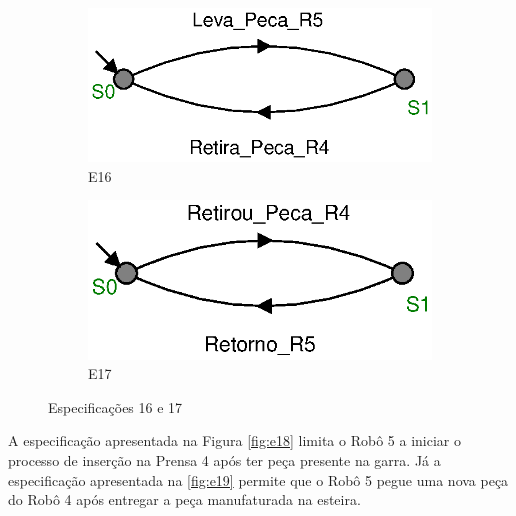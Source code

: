 \begin{figure}[H]%
  \centering
  \begin{subfigure}{0.45\textwidth}
      \centering
      \includegraphics[width=\textwidth]{imagens/E16.eps}
      \caption{E16}
      \label{fig:e16}
  \end{subfigure}
  \hfill
  \begin{subfigure}{0.45\textwidth}
      \centering
      \includegraphics[width=\textwidth]{imagens/E17.eps}
      \caption{E17}
      \label{fig:e17}
  \end{subfigure}
  \caption{Especificações 16 e 17}
  \label{fig:e1617}
\end{figure}

A especificação apresentada na Figura \ref{fig:e18} limita o Robô 5 a iniciar o processo de inserção na Prensa 4 após ter peça presente na garra.
Já a especificação apresentada na \ref{fig:e19} permite que o Robô 5 pegue uma nova peça do Robô 4 após entregar a peça manufaturada na esteira.

